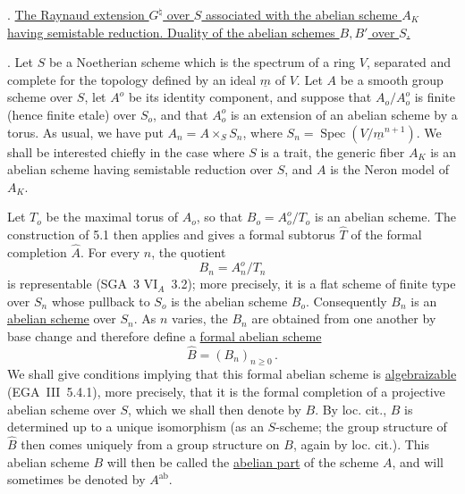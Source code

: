 
\medskip
{}. \underline{The Raynaud extension $G^\natural$ over $S$ associated
with the abelian scheme $A_K$ having semistable reduction.  Duality of
the abelian schemes $B,B'$ over $S$.}

\medskip
{}. Let $S$ be a Noetherian scheme which is the spectrum of a ring
$V$, separated and complete for the topology defined by an ideal
$\underline m$ of $V$.  Let $A$ be a smooth group scheme over $S$, let
$A^o$ be its identity component, and suppose that $A_o/A_o^o$ is
finite (hence finite etale) over $S_o$, and that $A_o^o$ is an
extension of an abelian scheme by a torus.  As usual, we have put
$A_n=A\times_S S_n$, where
$S_n=\operatorname{Spec}(V/\underline m^{n+1})$.  We shall be
interested chiefly in the case where $S$ is a trait, the generic fiber
$A_K$ is an abelian scheme having semistable reduction over $S$, and
$A$ is the Neron model of $A_K$.

Let $T_o$ be the maximal torus of $A_o$, so that
$B_o=A_o^o/T_o$ is an abelian scheme.  The construction of 5.1 then
applies and gives a formal subtorus $\widehat T$ of the formal
completion $\widehat A$.  For every $n$, the quotient
\begin{equation}\tag{7.1.1}
 B_n=A_n^o/T_n
\end{equation}
is representable (SGA~3 $\mathrm{VI}_A$~3.2); more precisely, it is a
flat scheme of finite type over $S_n$ whose pullback to $S_o$ is the
abelian scheme $B_o$.  Consequently $B_n$ is an \underline{abelian
scheme} over $S_n$.  As $n$ varies, the $B_n$ are obtained from one
another by base change and therefore define a \underline{formal
abelian scheme}
\begin{equation}\tag{7.1.2}
 \widehat B=(B_n)_{n\geqslant0}\,.
\end{equation}
We shall give conditions implying that this formal abelian scheme is
\underline{algebraizable} (EGA~III~5.4.1), more precisely, that it is
the formal completion of a projective abelian scheme over $S$, which
we shall then denote by $B$.  By loc. cit., $B$ is determined up to a
unique isomorphism (as an $S$-scheme; the group structure of
$\widehat B$ then comes uniquely from a group structure on $B$, again
by loc. cit.).  This abelian scheme $B$ will then be called the
\underline{abelian part} of the scheme $A$, and will sometimes be
denoted by $A^{\mathrm{ab}}$.

